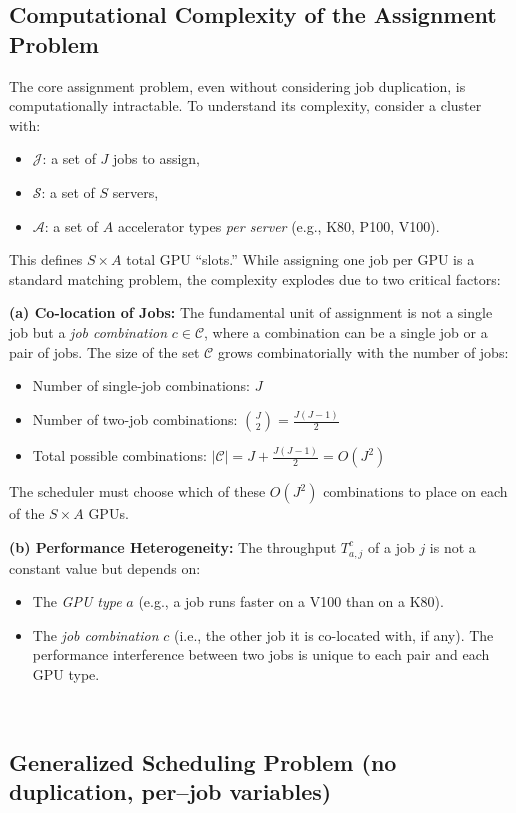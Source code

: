 \documentclass{article}
\begin{document}
\subsection{Computational Complexity of the Assignment Problem}
\label{subsec:complexity}

The core assignment problem, even without considering job duplication, is computationally intractable. To understand its complexity, consider a cluster with:
\begin{itemize}
    \item $\mathcal{J}$: a set of $J$ jobs to assign,
    \item $\mathcal{S}$: a set of $S$ servers,
    \item $\mathcal{A}$: a set of $A$ accelerator types \textit{per server} (e.g., K80, P100, V100).
\end{itemize}
This defines $S \times A$ total GPU ``slots.'' While assigning one job per GPU is a standard matching problem, the complexity explodes due to two critical factors:

\textbf{(a) Co-location of Jobs:}
The fundamental unit of assignment is not a single job but a \textit{job combination} $c \in \mathcal{C}$, where a combination can be a single job or a pair of jobs. The size of the set $\mathcal{C}$ grows combinatorially with the number of jobs:
\begin{itemize}
    \item Number of single-job combinations: $J$
    \item Number of two-job combinations: $\binom{J}{2} = \frac{J(J-1)}{2}$
    \item Total possible combinations: $|\mathcal{C}| = J + \frac{J(J-1)}{2} = {O(J^2)}$
\end{itemize}
The scheduler must choose which of these $O(J^2)$ combinations to place on each of the $S \times A$ GPUs.

\textbf{(b) Performance Heterogeneity:}
The throughput $T^{c}_{a,j}$ of a job $j$ is not a constant value but depends on:
\begin{itemize}
    \item The \textit{GPU type} $a$ (e.g., a job runs faster on a V100 than on a K80).
    \item The \textit{job combination} $c$ (i.e., the other job it is co-located with, if any). The performance interference between two jobs is unique to each pair and each GPU type.
\end{itemize}
\
\subsection{Generalized Scheduling Problem (no duplication, per–job variables)}
\end{document}
